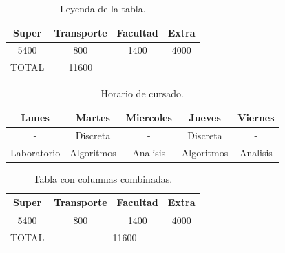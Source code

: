 \documentclass[]{article} %
\begin{document}
        \begin{table}[h] %
            \centering
            \caption{Leyenda de la tabla.}
            \begin{tabular}{|c|c|c|c|}
                \hline
                Super & Transporte & Facultad & Extra \\
                \hline
                5400 & 800 & 1400 & 4000 \\
                \hline
                TOTAL & 11600 \\
            \end{tabular}
            \label{tab:datos}
        \end{table}

        \begin{table}[h] %
            \centering
            \caption{Horario de cursado.}
            \begin{tabular}{|c|c|c|c|c|}
                \hline
                Lunes & Martes & Miercoles & Jueves & Viernes \\
                \hline
                - & Discreta & - & Discreta & - \\
                \hline
                Laboratorio & Algoritmos & Analisis & Algoritmos & Analisis \\
            \end{tabular}
            \label{tab:datos2}
        \end{table}
        

        \begin{table}[h]
            \centering
            \caption{Tabla con columnas combinadas.}
            \begin{tabular}{|c|c|c|c|}
                \hline
                Super & Transporte & Facultad & Extra \\
                \hline
                5400 & 800 & 1400 & 4000 \\
                \hline
                TOTAL & \multicolumn{3}{|c|}{11600} \\ 

                
            \end{tabular}
            \label{tab:datos3}
        \end{table}
\end{document}

